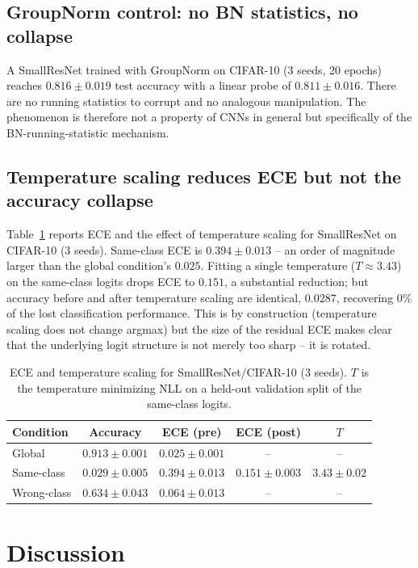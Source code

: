 \documentclass[11pt]{article}
\begin{document}
\subsection{GroupNorm control: no BN statistics, no collapse}
A SmallResNet trained with GroupNorm on CIFAR-10 (3 seeds, 20 epochs) reaches $0.816 \pm 0.019$ test accuracy with a linear probe of $0.811 \pm 0.016$. There are no running statistics to corrupt and no analogous manipulation. The phenomenon is therefore not a property of CNNs in general but specifically of the BN-running-statistic mechanism.

\subsection{Temperature scaling reduces ECE but not the accuracy collapse}
Table~\ref{tab:ece} reports ECE and the effect of temperature scaling for SmallResNet on CIFAR-10 (3 seeds). Same-class ECE is $0.394 \pm 0.013$ -- an order of magnitude larger than the global condition's $0.025$. Fitting a single temperature ($T \approx 3.43$) on the same-class logits drops ECE to $0.151$, a substantial reduction; but accuracy before and after temperature scaling are identical, $0.0287$, recovering $0\%$ of the lost classification performance. This is by construction (temperature scaling does not change argmax) but the size of the residual ECE makes clear that the underlying logit structure is not merely too sharp -- it is rotated.

\begin{table}[t]
\centering
\caption{ECE and temperature scaling for SmallResNet/CIFAR-10 (3 seeds). $T$ is the temperature minimizing NLL on a held-out validation split of the same-class logits.}
\label{tab:ece}
\small
\begin{tabular}{lcccc}
\toprule
Condition       & Accuracy            & ECE (pre)          & ECE (post)         & $T$ \\
\midrule
Global          & $0.913 \pm 0.001$   & $0.025 \pm 0.001$  & --                 & -- \\
Same-class      & $0.029 \pm 0.005$   & $0.394 \pm 0.013$  & $0.151 \pm 0.003$  & $3.43 \pm 0.02$ \\
Wrong-class     & $0.634 \pm 0.043$   & $0.064 \pm 0.013$  & --                 & -- \\
\bottomrule
\end{tabular}
\end{table}

\section{Discussion}
\end{document}

